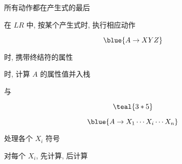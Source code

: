 \begin{frame}{}
  \begin{center}
    \begin{columns}
        \begin{center}
        \end{center}
        \begin{center}
        \end{center}
    \end{columns}

    \pause
    \vspace{0.80cm}
     所有动作都在产生式的最后

    \vspace{0.30cm}
    在 $LR$ 中, 按某个产生式时, 执行相应动作
  \end{center}
\end{frame}

\begin{frame}{}
  \begin{center}
    \[
      \blue{A \to X Y Z}
    \]


    时, 携带终结符的属性

    \vspace{0.30cm}
    时, 计算 $A$ 的属性值并入栈
  \end{center}
\end{frame}

\begin{frame}{}
  
\end{frame}

\begin{frame}{}
  \begin{center}
     与 

    \vspace{0.30cm}
    \vspace{-0.20cm}
    \[
      \teal{3 \ast 5}
    \]

    \pause
    \vspace{-0.50cm}
    \[
      \blue{A \to X_{1} \cdots X_{i} \cdots X_{n}}
    \]

     处理各个 $X_{i}$ 符号

    \vspace{0.10cm}
    对每个 $X_{i}$, 先计算, 后计算
  \end{center}
\end{frame}

